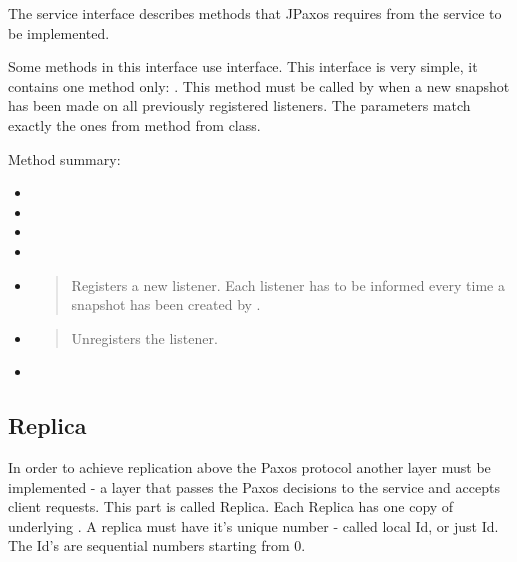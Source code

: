 \label{api:service-interface}\label{api:jpaxos-service}
The service interface describes methods that JPaxos requires from the service to be implemented.

Some methods in this interface use  interface. This interface is very simple, it contains one method only: . This method must be called by  when a new snapshot has been made on all previously registered listeners. The parameters match exactly the ones from  method from  class.

Method summary:
\begin{itemize}
\item {} 

\item {} 

\item {} 

\item {} 

\item {} 
\begin{quote}

Registers a new listener. Each listener has to be informed every time a snapshot has been created by .
\end{quote}

\item {} 
\begin{quote}

Unregisters the listener.
\end{quote}

\item {} 

\end{itemize}


\subsection{Replica}
\label{api:jpaxos-replica}\label{api:replica}
In order to achieve replication above the Paxos protocol another layer must be implemented - a layer that passes the Paxos decisions to the service and accepts client requests. This part is called Replica. Each Replica has one copy of underlying . A replica must have it's unique number - called local Id, or just Id. The Id's are sequential numbers starting from 0.


